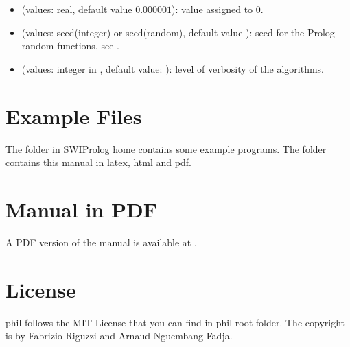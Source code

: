 \documentclass[letterpaper,10pt,english]{sphinxmanual}
\begin{document}
\begin{itemize}
\begin{itemize}
\item {} 
\sphinxAtStartPar
{} (values: real, default value \(0.000001\)): value assigned to \(0\).

\item {} 
\sphinxAtStartPar
{} (values: seed(integer) or seed(random), default value ): seed for the Prolog random functions, see  .

\item {} 
\sphinxAtStartPar
{} (values: integer in \sphinxcode{\sphinxupquote{{[}1,3{]}}}, default value: ): level of verbosity of the algorithms.

\end{itemize}

\end{itemize}


\chapter{Example Files}
\label{\detokenize{index:example-files}}
\sphinxAtStartPar
The  folder in SWI\sphinxhyphen{}Prolog home contains some example programs.
The  folder contains this manual in latex, html and pdf.


\chapter{Manual in PDF}
\label{\detokenize{index:manual-in-pdf}}
\sphinxAtStartPar
A PDF version of the manual is available at .


\chapter{License}
\label{\detokenize{index:license}}
\sphinxAtStartPar
phil follows the MIT License that you can find in phil root folder.
The copyright is by Fabrizio Riguzzi and Arnaud Nguembang Fadja.

\sphinxAtStartPar
\end{document}
